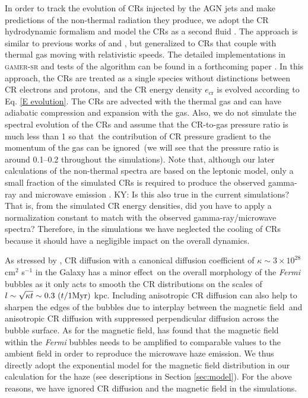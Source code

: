 \documentclass[fleqn,usenatbib,useAMS]{mnras}
\begin{document}
  In order to track the evolution of CRs injected by the AGN jets and make predictions of the non-thermal radiation they produce, we adopt the CR hydrodynamic formalism and model the CRs as a second fluid \citep{Zweibel2013}. The approach is similar to previous works of \cite{Guo2012} and \cite{Yang2012}, but generalized to CRs that couple with thermal gas moving with relativistic speeds. The detailed implementations in \textsc{gamer-sr} and tests of the algorithm can be found in a forthcoming paper \citep[][in prep.]{Chen2022}. In this approach, the CRs are treated as a single species without distinctions between CR electrons and protons,\
  and the CR energy density $e_{\text{cr}}$ is evolved according to Eq. \ref{E evolution}.
  The CRs are advected with the thermal gas and can have adiabatic compression and expansion with the gas. Also, we do not simulate the spectral evolution of the CRs and assume that the CR-to-gas pressure ratio is much less than 1 so that\
  the contribution of CR pressure gradient to the momentum of the gas can be ignored\
  (we will see that the pressure ratio is around 0.1--0.2 throughout the simulations). Note that, although our later calculations of the non-thermal spectra are based on the leptonic model, only a small fraction of the simulated CRs is required to produce the observed gamma-ray and microwave emission \citep{Yang2013}. {\color{red} KY: Is this also true in the current simulations? That is, from the simulated CR energy densities, did you have to apply a normalization constant to match with the observed gamma-ray/microwave spectra?} Therefore, in the simulations we have neglected the cooling of CRs because it should have a negligible impact on the overall dynamics.

  As stressed by \citet{Yang2012}, CR diffusion with a canonical diffusion coefficient of $\kappa \sim 3\times 10^{28}$ cm$^2$ s$^{-1}$ in the Galaxy has a minor effect\
  on the overall morphology of the \textit{Fermi} bubbles as it
  only acts to smooth the CR distributions on the scales of $l \sim \sqrt{\kappa t} \sim 0.3\ (t/1 {\rm Myr})$ kpc. Including anisotropic CR diffusion can also help to sharpen the edges of the bubbles due to interplay between the magnetic field\
  and anisotropic CR diffusion with suppressed perpendicular diffusion across the bubble surface. As for the magnetic field, \cite{Yang2013} has found that the magnetic field within the \textit{Fermi} bubbles needs to be amplified to comparable values to the ambient field in order to reproduce the microwave haze emission. We thus directly adopt the exponential model for the magnetic field distribution in our calculation for the haze (see descriptions in Section \ref{sec:model}).
   For the above reasons, we have ignored CR diffusion and the magnetic field in the simulations.\
\end{document}
